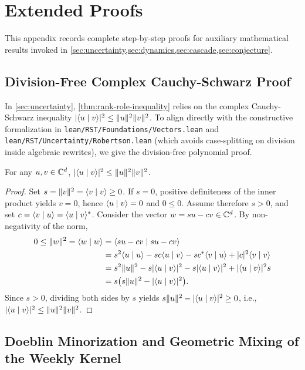 \section{Extended Proofs}
\label{app:proofs}

This appendix records complete step-by-step proofs for auxiliary mathematical
results invoked in \cref{sec:uncertainty,sec:dynamics,sec:cascade,sec:conjecture}.

\subsection{Division-Free Complex Cauchy-Schwarz Proof}
\label{app:proof-cs}

In \cref{sec:uncertainty}, \cref{thm:rank-role-inequality} relies on the
complex Cauchy-Schwarz inequality $\lvert \langle u \mid v \rangle \rvert^2 \le \lVert u \rVert^2 \lVert v \rVert^2$.
To align directly with the constructive formalization in
\texttt{lean/RST/Foundations/Vectors.lean} and \texttt{lean/RST/Uncertainty/Robertson.lean}
(which avoids case-splitting on division inside algebraic rewrites), we give
the division-free polynomial proof.

\begin{lemma}
\label{lem:app-cs}
For any $u, v \in \mathbb{C}^d$, $\lvert \langle u \mid v \rangle \rvert^2 \le \lVert u \rVert^2 \lVert v \rVert^2$.
\end{lemma}
\begin{proof}
Set $s = \lVert v \rVert^2 = \langle v \mid v \rangle \ge 0$. If $s = 0$, positive definiteness of
the inner product yields $v = 0$, hence $\langle u \mid v \rangle = 0$ and $0 \le 0$.
Assume therefore $s > 0$, and set $c = \langle v \mid u \rangle = \langle u \mid v \rangle^*$.
Consider the vector $w = s u - c v \in \mathbb{C}^d$. By non-negativity of the norm,
\begin{align*}
  0 \le \lVert w \rVert^2 = \langle w \mid w \rangle
  &= \langle s u - c v \mid s u - c v \rangle \\
  &= s^2 \langle u \mid u \rangle - s c \langle u \mid v \rangle - s c^* \langle v \mid u \rangle + \lvert c \rvert^2 \langle v \mid v \rangle \\
  &= s^2 \lVert u \rVert^2 - s \lvert \langle u \mid v \rangle \rvert^2 - s \lvert \langle u \mid v \rangle \rvert^2 + \lvert \langle u \mid v \rangle \rvert^2 s \\
  &= s \bigl(s \lVert u \rVert^2 - \lvert \langle u \mid v \rangle \rvert^2\bigr).
\end{align*}
Since $s > 0$, dividing both sides by $s$ yields $s \lVert u \rVert^2 - \lvert \langle u \mid v \rangle \rvert^2 \ge 0$,
i.e., $\lvert \langle u \mid v \rangle \rvert^2 \le \lVert u \rVert^2 \lVert v \rVert^2$.
\end{proof}

\subsection{Doeblin Minorization and Geometric Mixing of the Weekly Kernel}
\label{app:proof-doeblin}

